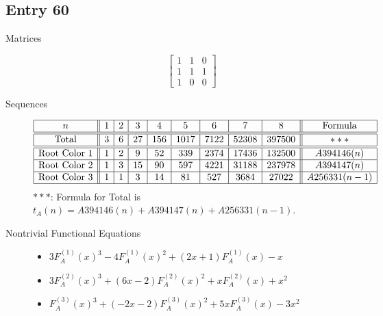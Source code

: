 \documentclass[12pt]{amsart}
\newcommand{\gff}[2]{F_{#2}^{(#1)}(x)}
\newcommand{\gfa}[1]{\gff{#1}{A}}
\begin{document}
\subsection*{Entry 60}
\begin{description}
    \item[Matrices]
    
    \[\begin{bmatrix}
1 & 1 & 0 \\
1 & 1 & 1 \\
1 & 0 & 0
\end{bmatrix}\]
    \item[Sequences]\hspace*{\fill}\vspace{-0.5cm}
    \begin{center}
        \[
        \begin{array}{|c||c|c|c|c|c|c|c|c||c|}\hline
           n  & 1 & 2 & 3 & 4 & 5 & 6 & 7 & 8  & \text{Formula}\\\hline\hline
           \text{Total}  & 3 & 6 & 27 & 156 & 1017 & 7122 & 52308 & 397500 & *** \\\hline\hline
           \text{Root Color }1 & 1 & 2 & 9 & 52 & 339 & 2374 & 17436 & 132500 & A394146(n)\\\hline
           \text{Root Color }2 & 1 & 3 & 15 & 90 & 597 & 4221 & 31188 & 237978 & A394147(n)\\\hline
           \text{Root Color }3 & 1 & 1 & 3 & 14 & 81 & 527 & 3684 & 27022 & A256331(n-1)\\\hline
        \end{array}
        \]
        $***$: Formula for Total is $t_A(n)=A394146(n)+A394147(n)+A256331(n-1)$.
    \end{center}
    
    \item[Nontrivial Functional Equations]\hspace*{\fill}

    \begin{itemize}
\item $3\gfa{1}^3-4\gfa{1}^2+(2x + 1)\gfa{1}-x$


\item $3\gfa{2}^3+(6x - 2)\gfa{2}^2+x\gfa{2}+x^2$


\item $\gfa{3}^3+(-2x - 2)\gfa{3}^2+5x\gfa{3}-3x^2$



\end{itemize}
\end{description}
\end{document}
